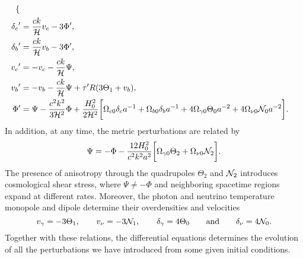 \documentclass[10pt,a4paper]{article}
\begin{document}
\begin{subequations}
\begin{align}
\begin{dcases}
	                       \end{dcases} \\
	{\delta_c}^\prime   &= \frac{ck}{\mathcal{H}} v_c - 3 \Phi^\prime , \\
	{\delta_b}^\prime   &= \frac{ck}{\mathcal{H}} v_b - 3 \Phi^\prime , \\
	{v_c}^\prime        &= -v_c - \frac{ck}{\mathcal{H}} \Psi , \\
	{v_b}^\prime        &= -v_b - \frac{ck}{\mathcal{H}} \Psi + \tau^\prime R (3\Theta_1 + v_b), \\
	{\Phi}^\prime       &= \Psi - \frac{c^2 k^2}{3 \mathcal{H}^2} \Phi + \frac{H_0^2}{2 \mathcal{H}^2} \bigg[ \Omega_{c0} \delta_c a^{-1} + \Omega_{b0} \delta_b a^{-1} + 4 \Omega_{\gamma 0} \Theta_0 a^{-2} + 4 \Omega_{\nu 0} \mathcal{N}_0 a^{-2} \bigg] .
\end{align}
\label{eq_perturb_full}
\end{subequations}
In addition, at any time, the metric perturbations are related by
\begin{equation}
	{\Psi}  = -\Phi - \frac{12 H_0^2}{c^2 k^2 a^2} \bigg[ \Omega_{\gamma 0} \Theta_2 + \Omega_{\nu 0} \mathcal{N}_2 \bigg] .
\end{equation}
The presence of anisotropy through the quadrupoles $\Theta_2$ and $\mathcal{N}_2$ introduces cosmological shear stress,
where $\Psi \neq -\Phi$ and neighboring spacetime regions expand at different rates.
Moreover, the photon and neutrino temperature monopole and dipole determine their overdensities and velocities
\begin{equation}
	v_\gamma = -3\Theta_1, \qquad
	v_\nu = -3\mathcal{N}_1, \qquad
	\delta_\gamma = 4\Theta_0 \qquad \text{and} \qquad
	\delta_\nu = 4\mathcal{N}_0.
\end{equation}
Together with these relations, the differential equations determines the evolution of all the perturbations we have introduced from some given initial conditions.
\end{document}
